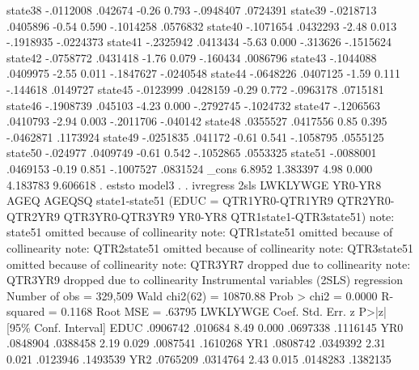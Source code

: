      state38 {\VBAR}  -.0112008    .042674    -0.26   0.793    -.0948407    .0724391
     state39 {\VBAR}  -.0218713   .0405896    -0.54   0.590    -.1014258    .0576832
     state40 {\VBAR}  -.1071654   .0432293    -2.48   0.013    -.1918935   -.0224373
     state41 {\VBAR}  -.2325942   .0413434    -5.63   0.000     -.313626   -.1515624
     state42 {\VBAR}  -.0758772   .0431418    -1.76   0.079     -.160434    .0086796
     state43 {\VBAR}  -.1044088   .0409975    -2.55   0.011    -.1847627   -.0240548
     state44 {\VBAR}  -.0648226   .0407125    -1.59   0.111     -.144618    .0149727
     state45 {\VBAR}  -.0123999   .0428159    -0.29   0.772    -.0963178    .0715181
     state46 {\VBAR}  -.1908739    .045103    -4.23   0.000    -.2792745   -.1024732
     state47 {\VBAR}  -.1206563   .0410793    -2.94   0.003    -.2011706    -.040142
     state48 {\VBAR}   .0355527   .0417556     0.85   0.395    -.0462871    .1173924
     state49 {\VBAR}  -.0251835    .041172    -0.61   0.541    -.1058795    .0555125
     state50 {\VBAR}   -.024977   .0409749    -0.61   0.542    -.1052865    .0553325
     state51 {\VBAR}  -.0088001   .0469153    -0.19   0.851    -.1007527    .0831524
       _cons {\VBAR}     6.8952   1.383397     4.98   0.000     4.183783    9.606618
{\smallskip}
. eststo model3
{\smallskip}
. 
. ivregress 2sls LWKLYWGE YR0-YR8 AGEQ AGEQSQ state1-state51 (EDUC = QTR1YR0-QTR1YR9 QTR2YR0-QTR2YR9 QTR3YR0-QTR3YR9 YR0-YR8 QTR1state1-QTR3state51)
note: state51 omitted because of collinearity
note: QTR1state51 omitted because of collinearity
note: QTR2state51 omitted because of collinearity
note: QTR3state51 omitted because of collinearity
note: QTR3YR7 dropped due to collinearity
note: QTR3YR9 dropped due to collinearity
{\smallskip}
Instrumental variables (2SLS) regression          Number of obs   =    329,509
                                                  Wald chi2(62)   =   10870.88
                                                  Prob > chi2     =     0.0000
                                                  R-squared       =     0.1168
                                                  Root MSE        =     .63795
{\smallskip}
    LWKLYWGE {\VBAR}      Coef.   Std. Err.      z    P>|z|     [95\% Conf. Interval]
        EDUC {\VBAR}   .0906742    .010684     8.49   0.000     .0697338    .1116145
         YR0 {\VBAR}   .0848904   .0388458     2.19   0.029     .0087541    .1610268
         YR1 {\VBAR}   .0808742   .0349392     2.31   0.021     .0123946    .1493539
         YR2 {\VBAR}   .0765209   .0314764     2.43   0.015     .0148283    .1382135
